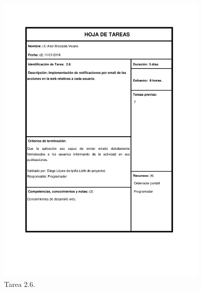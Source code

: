 \documentclass{DeustoFDP}
\begin{document}
\begin{figure}[H]
	\centering
	\includegraphics[width=0.9\textwidth]{fig/Tareas/26}
	\caption{Tarea 2.6.}
	\label{fig:t26}
\end{figure}
\end{document}
